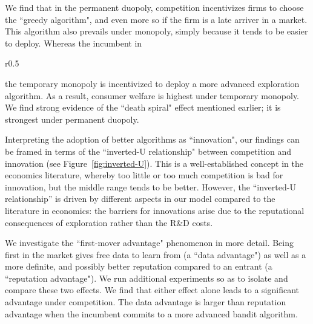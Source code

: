 \documentclass[acmsmall]{ec19acm}
\theoremstyle{definition}
\newcommand{\xhdr}[1]{\vspace{1mm} \noindent{\bf #1}}
\begin{document}
\xhdr{Main findings.}
We find that in the permanent duopoly, competition incentivizes firms to choose the ``greedy algorithm", and even more so if the firm is a late arriver in a market. This algorithm also prevails under monopoly, simply because it tends to be easier to deploy. Whereas the incumbent in 
\begin{wrapfigure}{r}{0.5\textwidth}
\vspace{-2mm}
\begin{center}
 \caption{A stylized ``inverted-U relationship" between strength of competition and ``level of innovation".}
\label{fig:inverted-U}
\end{center}
\end{wrapfigure}
the temporary monopoly is incentivized to deploy a more advanced exploration algorithm. As a result, consumer welfare is highest under temporary monopoly. We find strong evidence of the ``death spiral" effect mentioned earlier; it is strongest under permanent duopoly.


Interpreting the adoption of better algorithms as ``innovation", our findings can be framed in terms of the ``inverted-U relationship" between competition and innovation (see Figure~\ref{fig:inverted-U}). This is a well-established concept in the economics literature,
whereby too little or too much competition is bad for innovation, but the middle range tends to be better. However, the ``inverted-U relationship'' is driven by different aspects in our model compared to the literature in economics:  the barriers for innovations arise due to the reputational consequences of exploration rather than the R\&D costs.


\xhdr{Additional findings.}
We investigate the ``first-mover advantage" phenomenon in more detail. Being first in the market gives free data to learn from (a ``data advantage") as well as a more definite, and possibly better reputation compared to an entrant (a ``reputation advantage"). We run additional experiments so as to isolate and compare these two effects. We find that either effect alone leads to a significant advantage under competition. The data advantage is larger than reputation advantage when the incumbent commits to a more advanced bandit algorithm.
\end{document}
